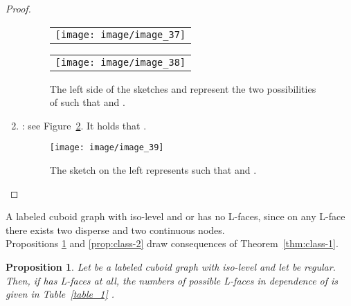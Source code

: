 \documentclass[a4paper,11pt]{article}
\newtheorem{proposition}[theorem]{Proposition}
\begin{document}
\begin{proof}
\begin{enumerate}
\begin{figure}[!ht]
\begin{tabular}[c]{l}
\texttt{[image: image/image\_37]}
\end{tabular}
\hspace{0.8cm}
\begin{tabular}[c]{l}
\texttt{[image: image/image\_38]}
\end{tabular}
\caption{The left side of the sketches  and  represent the two possibilities of  such that 
and .}
\label{image_37_38}
\end{figure}
\FloatBarrier
\item : see Figure~\ref{image_39}. It holds that .
\begin{figure}[!ht]
\texttt{[image: image/image\_39]}
\caption{The sketch on the left represents  such that  and .}
\label{image_39}
\end{figure}
\end{enumerate}
\vspace{-0.9cm}
\end{proof}
\FloatBarrier
{}A labeled cuboid graph  with iso-level  and 
or  has no L-faces, since on any L-face there exists two disperse and two continuous nodes.\\

Propositions \ref{prop:class-1} and \ref{prop:class-2} draw consequences of Theorem~\ref{thm:class-1}.
\begin{proposition}Let  be a labeled cuboid graph with iso-level 
and let  be regular. Then, if  has L-faces at all, the numbers of possible L-faces in dependence
of  is given in Table~\ref{table_1} .
\label{prop:class-1}
\end{proposition}
\end{document}
